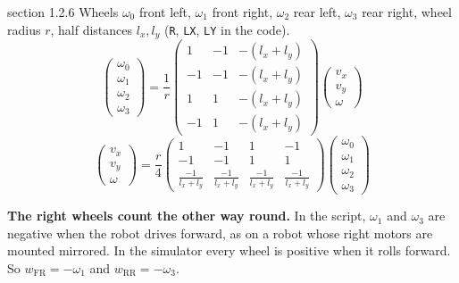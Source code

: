 \documentclass[11pt,a4paper,parskip=half]{scrartcl}
\newcommand{\thema}[1]{\texttt{#1}}
\begin{document}
\begin{script}{section 1.2.6}
Wheels \(\omega_0\) front left, \(\omega_1\) front right, \(\omega_2\) rear left, \(\omega_3\) rear right,
wheel radius \(r\), half distances \(l_x, l_y\) (\thema{R}, \thema{LX}, \thema{LY} in the code).
\begin{equation}
  \begin{pmatrix}\omega_0\\ \omega_1\\ \omega_2\\ \omega_3\end{pmatrix} = \frac 1r
  \begin{pmatrix}
     1 & -1 & -(l_x + l_y)\\
    -1 & -1 & -(l_x + l_y)\\
     1 &  1 & -(l_x + l_y)\\
    -1 &  1 & -(l_x + l_y)
  \end{pmatrix}
  \begin{pmatrix} v_x\\ v_y\\ \omega \end{pmatrix}
  \tag{1.39}
\end{equation}
\begin{equation}
  \begin{pmatrix} v_x\\ v_y\\ \omega \end{pmatrix} = \frac r4
  \begin{pmatrix}
     1 & -1 & 1 & -1\\
    -1 & -1 & 1 &  1\\
    \frac{-1}{l_x + l_y} & \frac{-1}{l_x + l_y} & \frac{-1}{l_x + l_y} & \frac{-1}{l_x + l_y}
  \end{pmatrix}
  \begin{pmatrix}\omega_0\\ \omega_1\\ \omega_2\\ \omega_3\end{pmatrix}
  \tag{1.40}
\end{equation}
\end{script}

\newpage
\begin{note}
\textbf{The right wheels count the other way round.} In the script, \(\omega_1\) and \(\omega_3\) are
negative when the robot drives forward, as on a robot whose right motors are mounted mirrored. In the
simulator every wheel is positive when it rolls forward. So
\(w_\text{FR} = -\omega_1\) and \(w_\text{RR} = -\omega_3\).
\end{note}
\end{document}
